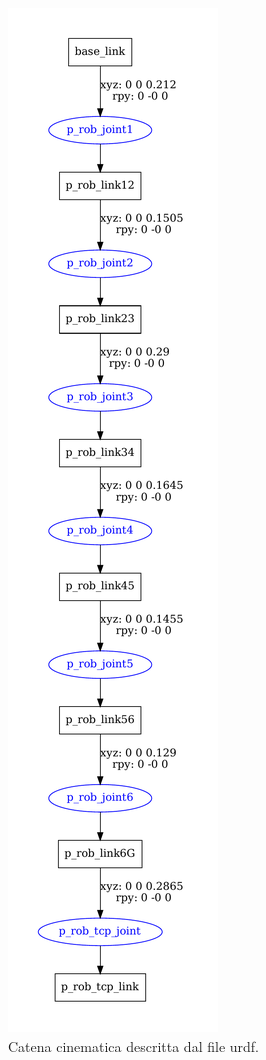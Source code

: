 \newpage
\begin{figure}[tbh]
	\centering
	\includegraphics[width=0.3\linewidth]{./OtherFiles/p_rob.pdf}
	\caption{Catena cinematica descritta dal file urdf.}
	\label{fig:urdf_prob3}
\end{figure}

